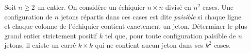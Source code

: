 Soit $n \geq 2$ un entier. On considère un échiquier $n \times n$ divisé en $n^2$ cases. Une configuration de
$n$ jetons répartis dans ces cases est dite \emph{paisible} si chaque ligne et chaque colonne de l'échiquier
contient exactement un jeton. Déterminer le plus grand entier strictement positif $k$ tel que, pour toute
configuration paisible de $n$ jetons, il existe un carré $k \times k$ qui ne contient aucun jeton dans ses
$k^2$ cases.
